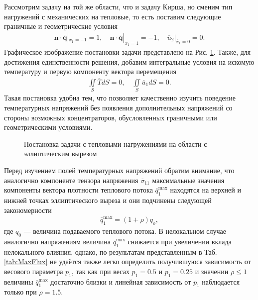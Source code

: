 Рассмотрим задачу на той же области, что и задачу Кирша, но сменим тип нагружений с механических на тепловые, то есть поставим следующие граничные и геометрические условия
\begin{gather*}
	\boldsymbol{n} \cdot \overline{\boldsymbol{q}}|_{\overline{x}_1 = -1} = 1,
	\quad
	\boldsymbol{n} \cdot \overline{\boldsymbol{q}}|_{\overline{x}_1 = 1} = -1,
	\quad
	\overline{u}_2 |_{\overline{x}_1 = 0} = 0.
\end{gather*}
Графическое изображение постановки задачи представлено на Рис. \ref{fig:ThermalKirshProblem}. Также, для достижения единственности решения, добавим интегральные условия на искомую температуру и первую компоненту вектора перемещения
\begin{gather*}
	\iint\limits_S \overline{T} dS = 0,
	\quad
	\iint\limits_S \overline{u}_1 dS = 0.
\end{gather*}
Такая постановка удобна тем, что позволяет качественно изучить поведение температурных напряжений без появления дополнительных напряжений со стороны возможных концентраторов, обусловленных граничными или геометрическими условиями.

\begin{figure}[ht]
    \caption{Постановка задачи с тепловыми нагружениями на области с эллиптическим вырезом}
    \label{fig:ThermalKirshProblem}
\end{figure}

Перед изучением полей температурных напряжений обратим внимание, что аналогично компоненте тензора напряжения $\overline{\sigma}_{11}$ максимальные значения компоненты вектора плотности теплового потока $\overline{q}_1^{\max}$ находятся на верхней и нижней точках эллиптического выреза и они подчинены следующей закономерности
\begin{gather*}
	\overline{q}_1^{\max} = (1 + \rho) q_o,
\end{gather*}
где $q_0$ --- величина подаваемого теплового потока. В нелокальном случае аналогично напряжениям величина $\overline{q}_1^{\max}$ снижается при увеличении вклада нелокального влияния, однако, по результатам представленным в Таб. \ref{tab:MaxFlux} не удаётся также легко определить получившуюся зависимость от весового параметра $p_1$, так как при весах $p_1 = 0.5$ и $p_1 = 0.25$ и значении $\rho \leqslant 1$ величины $\overline{q}_1^{\max}$ достаточно близки и линейная зависимость от $p_1$ наблюдается только при $\rho = 1.5$.

